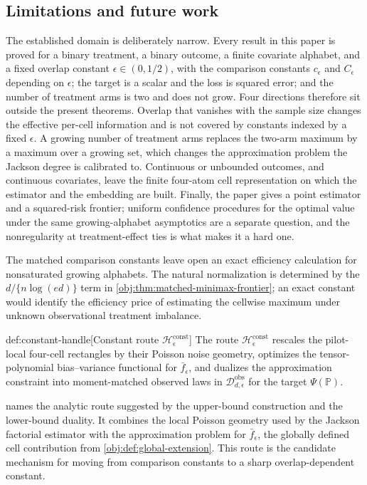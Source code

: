 \subsection{Limitations and future work}

The established domain is deliberately narrow. Every result in this paper is proved for a binary treatment, a binary outcome, a finite covariate alphabet, and a fixed overlap constant \(\epsilon\in(0,1/2)\), with the comparison constants \(c_\epsilon\) and \(C_\epsilon\) depending on \(\epsilon\); the target is a scalar and the loss is squared error; and the number of treatment arms is two and does not grow. Four directions therefore sit outside the present theorems. Overlap that vanishes with the sample size changes the effective per-cell information and is not covered by constants indexed by a fixed \(\epsilon\). A growing number of treatment arms replaces the two-arm maximum by a maximum over a growing set, which changes the approximation problem the Jackson degree is calibrated to. Continuous or unbounded outcomes, and continuous covariates, leave the finite four-atom cell representation on which the estimator and the embedding are built. Finally, the paper gives a point estimator and a squared-risk frontier; uniform confidence procedures for the optimal value under the same growing-alphabet asymptotics are a separate question, and the nonregularity at treatment-effect ties is what makes it a hard one.


The matched comparison constants leave open an exact efficiency calculation for nonsaturated growing alphabets. The natural normalization is determined by the \(d/\{n\log(ed)\}\) term in \cref{obj:thm:matched-minimax-frontier}; an exact constant would identify the efficiency price of estimating the cellwise maximum under unknown observational treatment imbalance.

\begin{definitionv}{def:constant-handle}[Constant route \(\mathscr H_\epsilon^{\mathrm{const}}\)]
The route \(\mathscr H_\epsilon^{\mathrm{const}}\) rescales the pilot-local four-cell rectangles by their Poisson noise geometry, optimizes the tensor-polynomial bias--variance functional for \(\bar f_\epsilon\), and dualizes the approximation constraint into moment-matched observed laws in \(\mathcal D_{d,\epsilon}^{\mathrm{obs}}\) for the target \(\Psi(\mathbb P)\).
\end{definitionv}

 names the analytic route suggested by the upper-bound construction and the lower-bound duality. It combines the local Poisson geometry used by the Jackson factorial estimator with the approximation problem for \(\bar f_\epsilon\), the globally defined cell contribution from \cref{obj:def:global-extension}. This route is the candidate mechanism for moving from comparison constants to a sharp overlap-dependent constant.

